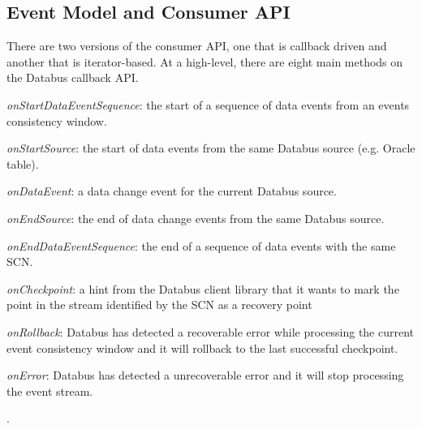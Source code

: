 \subsection{Event Model and Consumer API}

\lstset{basicstyle=\small}


There are two versions of the consumer API, one that is callback driven and another that is iterator-based. 
At a high-level, there are eight main methods on the Databus callback API.

\begin{itemize*}
\item \emph{onStartDataEventSequence}: the start of a sequence of data events from an events consistency window.
\item \emph{onStartSource}: the start of data events from the same Databus source (e.g. Oracle table). 
\item \emph{onDataEvent}: a data change event for the current Databus source.
\item \emph{onEndSource}: the end of data change events from the same Databus source.
\item \emph{onEndDataEventSequence}: the end of a sequence of data events with the same SCN.
\item \emph{onCheckpoint}: a hint from the Databus client library that it wants to mark the point in the stream identified by the SCN as a recovery point
\item \emph{onRollback}: Databus has detected a recoverable error while processing the current event consistency window and it will rollback to the last successful checkpoint.
\item \emph{onError}: Databus has detected a unrecoverable error and it will stop processing the event stream.
\end{itemize*}.

